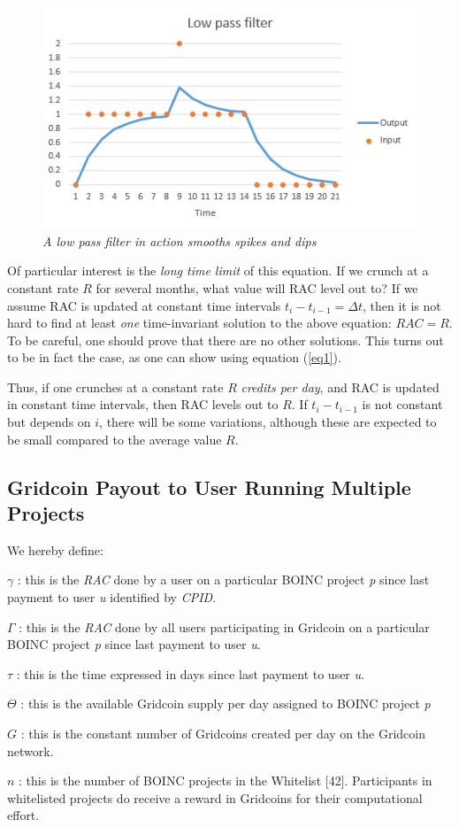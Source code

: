 \begin{figure}
\centering
\includegraphics{figures/low-pass}
\caption{\textit{A low pass filter in action smooths spikes and dips}}
\small
\label{fig:low-pass-filter}
\end{figure}

Of particular interest is the \emph{long time limit} of this equation. If we crunch at a constant rate $R$ for several months, what value will RAC level out to? If we assume RAC is updated at constant time intervals $t_i - t_{i-1} = \Delta t$, then it is not hard to find at least \emph{one} time-invariant solution to the above equation: $RAC = R$. To be careful, one should prove that there are no other solutions. This turns out to be in fact the case, as one can show using equation (\ref{eq1}).

Thus, if one crunches at a constant rate $R$ \emph{credits per day}, and RAC is updated in constant time intervals, then RAC levels out to $R$. If $t_i - t_{i-1}$ is not constant but depends on $i$, there will be some variations, although these are expected to be small compared to the average value $R$.

\subsection{Gridcoin Payout to User Running Multiple Projects}

We hereby define:
\begin{description}
  \item{$\gamma$} : this is the \textit{RAC} done by a user on a particular BOINC project \textit{p} since last payment to user \textit{u} identified by \textit{CPID}.
  \item{$\Gamma$} : this is the \textit{RAC} done by all users participating in Gridcoin on a particular BOINC project \textit{p} since last payment to user \textit{u}.
  \item{$\tau$} : this is the time expressed in days since last payment to user \textit{u}.
  \item{$\Theta$} : this is the available Gridcoin supply per day assigned to BOINC project \textit{p}
  \item{$G$} : this is the constant number of Gridcoins created per day on the Gridcoin network. 
  \item{$n$} : this is the number of BOINC projects in the Whitelist [42]. Participants in whitelisted projects do receive a reward in Gridcoins for their computational effort.  
\end{description}

